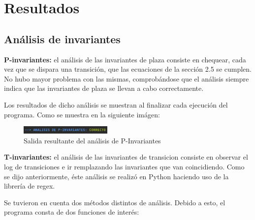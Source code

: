 \documentclass{article}
\begin{document}
    \section{Resultados}
    \subsection{Análisis de invariantes}
    \textbf{P-invariantes: } el análisis de las invariantes de plaza consiste en chequear, 
    cada vez que se dispara una transición, que las ecuaciones de la sección 2.5 se cumplen.
    No hubo mayor problema con las mismas, comprobándose que el análisis siempre indica que
    las invariantes de plaza se llevan a cabo correctamente. \par
    Los resultados de dicho análisis se muestran al finalizar cada ejecución del programa.
    Como se muestra en la siguiente imágen:
    \begin{figure}[H]
        \includegraphics[width=0.4\textwidth, center]{analisis-invariantes-ej.png}
        \caption{Salida resultante del análisis de P-Invariantes}
    \end{figure}
    \textbf{T-invariantes: } el análisis de las invariantes de transicion consiste en 
    observar el log de transiciones e ir remplazando las invariantes que van coincidiendo.
    Como se dijo anteriormente, éste análisis se realizó en Python haciendo uso de la 
    librería de regex. \par
    Se tuvieron en cuenta dos métodos distintos de análisis. Debido a esto, el programa 
    consta de dos funciones de interés: \par
\end{document}
